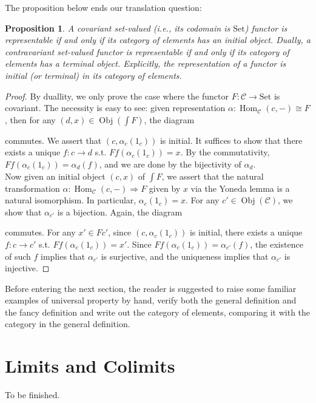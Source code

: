 \documentclass{article}
\newtheorem{proposition}{Proposition}[section]
\theoremstyle{definition}
\theoremstyle{definition}
\theoremstyle{remark}
\DeclareMathOperator{\Obj}{Obj}
\DeclareMathOperator{\Hom}{Hom}
\begin{document}
The proposition below ends our translation question:
\begin{proposition}A covariant set-valued (i.e., its codomain is $\mathrm{Set}$) functor is representable if and only if its category of elements has an initial object. Dually, a contravariant set-valued functor is representable if and only if its category of elements has a terminal object. Explicitly, the representation of a functor is initial (or terminal) in its category of elements.
\end{proposition}
\begin{proof}
By duallity, we only prove the case where the functor $F:\mathcal{C}\to \mathrm{Set}$ is covariant. The necessity is easy to see: given representation $\alpha:\Hom_\mathcal{C}(c,-)\cong F$, then for any $(d,x)\in \Obj(\int F)$, the diagram 
	\begin{center}
	\end{center}
	commutes. We assert that $(c,\alpha_c(1_c))$ is initial. It suffices to show that there exists a unique $f:c\to d$ s.t. $Ff(\alpha_c(1_c))=x$. By the commutativity, $Ff(\alpha_c(1_c))=\alpha_d(f)$, and we are done by the bijectivity of $\alpha_d$.\\
	Now given an initial object $(c,x)$ of $\int F$, we assert that the natural transformation $\alpha:\Hom_\mathcal{C}(c,-)\Rightarrow F$ given by $x$ via the Yoneda lemma is a natural isomorphism. In particular, $\alpha_c(1_c)=x$. For any $c'\in\Obj(\mathcal{C})$, we show that $\alpha_{c'}$ is a bijection. Again, the diagram
	\begin{center}
	\end{center}
	commutes. For any $x'\in Fc'$, since $(c,\alpha_c(1_c))$ is initial, there exists a unique $f:c\to c'$ s.t. $Ff(\alpha_c(1_c))=x'$. Since $Ff(\alpha_c(1_c))=\alpha_{c'}(f)$, the existence of such $f$ implies that $\alpha_{c'}$ is surjective, and the uniqueness implies that $\alpha_{c'}$ is injective.
\end{proof}
Before entering the next section, the reader is suggested to raise some familiar examples of universal property by hand, verify both the general definition and the fancy definition and write out the category of elements, comparing it with the category in the general definition.
\newpage
\section{Limits and Colimits}
To be finished.
\end{document}
